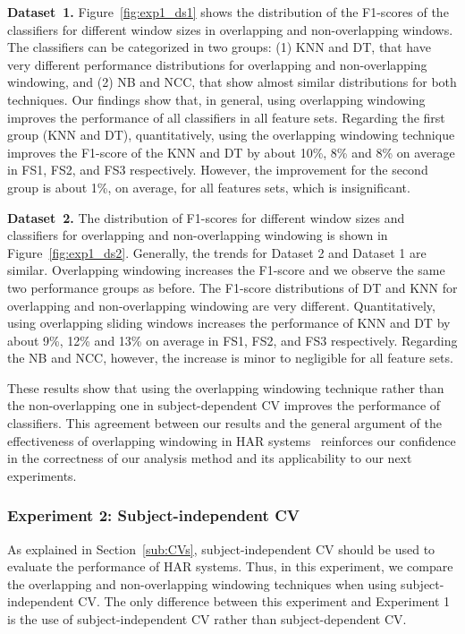 \noindent\textbf{Dataset~1.} Figure~\ref{fig:exp1_ds1} shows the distribution of the F1-scores of the classifiers for different window sizes in overlapping and non-overlapping windows. The classifiers can be categorized in two groups: (1) KNN and DT, that have very different performance distributions for overlapping and non-overlapping windowing, and (2) NB and NCC, that show almost similar distributions for both techniques. Our findings show that, in general, using overlapping windowing improves the performance of all classifiers in all feature sets. Regarding the first group (KNN and DT), quantitatively, using the overlapping windowing technique improves the F1-score of the KNN and DT by about 10\%, 8\% and 8\% on average in FS1, FS2, and FS3 respectively. However, the improvement for the second group is about 1\%, on average, for all features sets, which is insignificant.

\noindent\textbf{Dataset~2.} The distribution of F1-scores for different window sizes and classifiers for overlapping and non-overlapping windowing is shown in Figure~\ref{fig:exp1_ds2}. Generally, the trends for Dataset 2 and Dataset 1 are similar. Overlapping windowing increases the F1-score and we observe the same two performance groups as before. The F1-score distributions of DT and KNN for overlapping and non-overlapping windowing are very different. Quantitatively, using overlapping sliding windows increases the performance of KNN and DT by about 9\%, 12\% and 13\% on average in FS1, FS2, and FS3 respectively. Regarding the NB and NCC, however, the increase is minor to negligible for all feature sets. 

These results show that using the overlapping windowing technique rather than the non-overlapping one in subject-dependent CV improves the performance of classifiers. This agreement between our results and the general argument of the effectiveness of overlapping windowing in HAR systems~\cite{janidarmian2017comprehensive,janidarmian2014automated}
reinforces our confidence in the correctness of our analysis method and its applicability to our next experiments.  



\subsubsection{Experiment 2: Subject-independent CV} \label{sec:ex2}
As explained in Section~\ref{sub:CVs},  subject-independent CV should be used to evaluate the performance of HAR systems. Thus, in this experiment, we compare the overlapping and non-overlapping windowing techniques when using subject-independent CV.  The only difference between this experiment and Experiment 1 is the use of subject-independent CV rather than subject-dependent CV.



